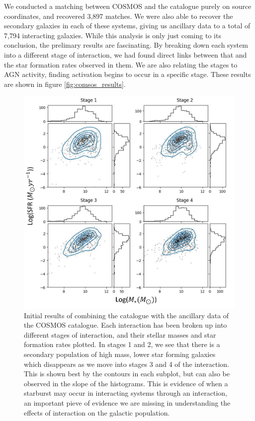 \documentclass[11pt,usenatbib]{article}
\begin{document}
We conducted a matching between COSMOS and the \citet{O'Ryan} catalogue purely on source coordinates, and recovered 3,897 matches. We were also able to recover the secondary galaxies in each of these systems, giving us ancillary data to a total of 7,794 interacting galaxies. While this analysis is only just coming to its conclusion, the prelimary results are fascinating. By breaking down each system into a different stage of interaction, we had found direct links between that and the star formation rates observed in them. We are also relating the stages to AGN activity, finding activation begins to occur in a specific stage. These results are shown in figure \ref{fig:comsos_results}.

\begin{figure}
    \centering
    \includegraphics[width=\textwidth]{figures/stage-evol.jpg}
    \caption{Initial results of combining the \citet{O'Ryan} catalogue with the ancillary data of the COSMOS catalogue. Each interaction has been broken up into different stages of interaction, and their stellar masses and star formation rates plotted. In stages 1 and 2, we see that there is a secondary population of high mass, lower star forming galaxies which disappears as we move into stages 3 and 4 of the interaction. This is shown best by the contours in each subplot, but can also be observed in the slope of the histograms. This is evidence of when a starburst may occur in interacting systems through an interaction, an important pieve of evidence we are missing in understanding the effects of interaction on the galactic population.}
    \label{fig:cosmos-label}
\end{figure}
\end{document}
